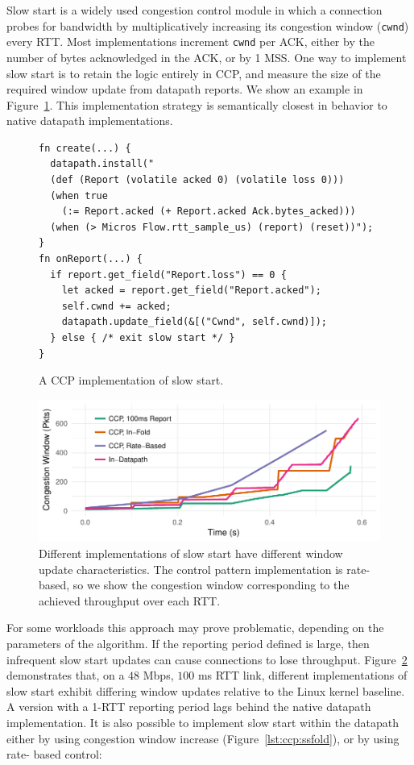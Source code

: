 Slow start is a widely used congestion control module in which a connection probes for bandwidth by multiplicatively increasing its congestion window (\texttt{cwnd}) every RTT. Most implementations increment \texttt{cwnd} per ACK, either by the number of bytes acknowledged in the ACK, or by 1 MSS. One way to implement slow start is to retain the logic entirely in CCP, and measure the size of the required window update from datapath reports. We show an example in Figure~\ref{lst:ccp:ss}. This implementation strategy is semantically closest in behavior to native datapath implementations.

\begin{figure}[h]
{\footnotesize
\begin{verbatim}
fn create(...) {
  datapath.install("
  (def (Report (volatile acked 0) (volatile loss 0)))
  (when true 
    (:= Report.acked (+ Report.acked Ack.bytes_acked)))
  (when (> Micros Flow.rtt_sample_us) (report) (reset))");
}
fn onReport(...) {
  if report.get_field("Report.loss") == 0 {
    let acked = report.get_field("Report.acked");
    self.cwnd += acked;
    datapath.update_field(&[("Cwnd", self.cwnd)]);
  } else { /* exit slow start */ }
}
\end{verbatim}
}
\vspace{-10pt}
\caption{A CCP implementation of slow start.} \label{lst:ccp:ss}
\vspace{-15pt}
\end{figure}

\begin{figure}[h]
    \centering
    \includegraphics[width=\columnwidth]{img/ss-evo}
    \caption{Different implementations of slow start have different window update characteristics. The control pattern implementation is rate-based, so we show the congestion window corresponding to the achieved throughput over each RTT.}
    \label{fig:ccp:ss}
\end{figure}

For some workloads this approach may prove problematic, depending on the parameters of the algorithm. If the reporting period defined is large, then infrequent slow start updates can cause connections to lose throughput.
Figure~\ref{fig:ccp:ss} demonstrates that, on a $48$ Mbps, $100$ ms RTT link, different implementations of slow start exhibit differing window updates relative to the Linux kernel baseline.
A version with a 1-RTT reporting period lags behind the native datapath implementation. It is also possible to implement slow start within the datapath either by using congestion window increase (Figure~\ref{lst:ccp:ssfold}), or by using rate- based control: 

